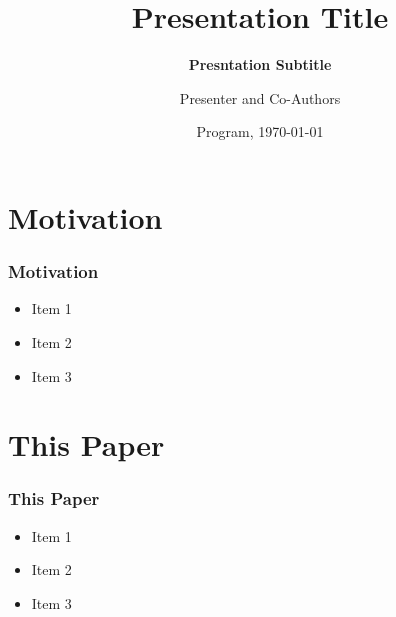 \documentclass[11pt]{beamer}
\begin{document}
	
	\title[Presentation Title]{\bfseries Presentation Title}
	\subtitle{\bfseries Presntation Subtitle}
	\author[Full Name]{Presenter and Co-Authors}
	
	
	\date[\today]{Program, \today}
	
	\begin{frame}[plain]
		\maketitle
		
	\end{frame}
	\setcounter{framenumber}{0}
	
	\section{Motivation}
	\begin{frame}
		\frametitle{\bfseries Motivation}
		
		\begin{itemize}
			\item Item 1
			\item Item 2
			\item Item 3
		\end{itemize}
	\end{frame}
	
	\section[]{This Paper}
	\begin{frame}
		\frametitle{\bfseries This Paper}
		
		\begin{itemize}
			\item Item 1
			\item Item 2
			\item Item 3
		\end{itemize}
		
	\end{frame}
	
\end{document}
